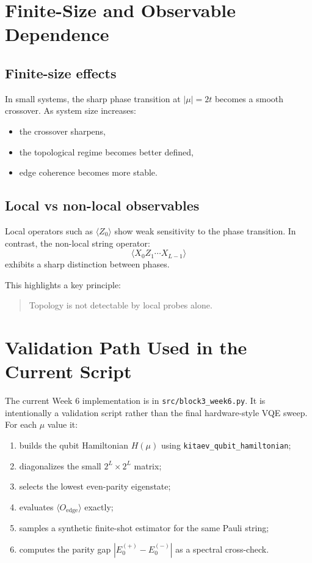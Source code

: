 \documentclass[11pt]{article}
\begin{document}
\section{Finite-Size and Observable Dependence}

\subsection*{Finite-size effects}
In small systems, the sharp phase transition at $|\mu|=2t$ becomes a smooth crossover. As system size increases:
\begin{itemize}
  \item the crossover sharpens,
  \item the topological regime becomes better defined,
  \item edge coherence becomes more stable.
\end{itemize}

\subsection*{Local vs non-local observables}
Local operators such as $\langle Z_0 \rangle$ show weak sensitivity to the phase transition. In contrast, the non-local string operator:
\begin{equation}
  \langle X_0 Z_1 \cdots X_{L-1} \rangle
\end{equation}
exhibits a sharp distinction between phases.

This highlights a key principle:
\begin{quote}
Topology is not detectable by local probes alone.
\end{quote}
\section{Validation Path Used in the Current Script}

The current Week 6 implementation is in \texttt{src/block3\_week6.py}. It is intentionally a validation script rather than the final hardware-style VQE sweep. For each $\mu$ value it:
\begin{enumerate}
  \item builds the qubit Hamiltonian $H(\mu)$ using \texttt{kitaev\_qubit\_hamiltonian};
  \item diagonalizes the small $2^L\times 2^L$ matrix;
  \item selects the lowest even-parity eigenstate;
  \item evaluates $\langle O_{\mathrm{edge}}\rangle$ exactly;
  \item samples a synthetic finite-shot estimator for the same Pauli string;
  \item computes the parity gap $|E_0^{(+)}-E_0^{(-)}|$ as a spectral cross-check.
\end{enumerate}
\end{document}
